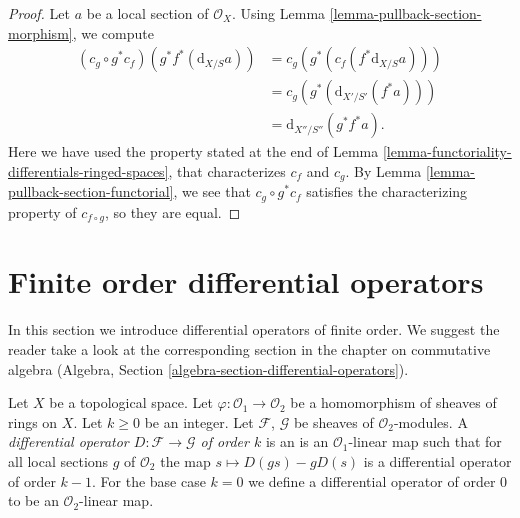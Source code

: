 \begin{proof}
Let $a$ be a local section of $\mathcal{O}_X$.
Using Lemma \ref{lemma-pullback-section-morphism}, we compute
\begin{align*}
(c_g\circ g^*c_f)(g^*f^*(\text{d}_{X/S}a))
&=c_g(g^*(c_f(f^*\text{d}_{X/S}a)))\\
&=c_g(g^*(\text{d}_{X'/S'}(f^*a)))\\
&=\text{d}_{X''/S''}(g^*f^*a).
\end{align*}
Here we have used the property stated at the end of
Lemma \ref{lemma-functoriality-differentials-ringed-spaces},
that characterizes $c_f$ and $c_g$.
By Lemma \ref{lemma-pullback-section-functorial},
we see that $c_g\circ g^*c_f$ satisfies the characterizing
property of $c_{f\circ g}$, so they are equal.
\end{proof}
















\section{Finite order differential operators}
\label{section-differential-operators}

\noindent
In this section we introduce differential operators of finite order.
We suggest the reader take a look at the corresponding section
in the chapter on commutative algebra
(Algebra, Section \ref{algebra-section-differential-operators}).

\begin{definition}
\label{definition-differential-operators}
Let $X$ be a topological space. Let $\varphi : \mathcal{O}_1 \to \mathcal{O}_2$
be a homomorphism of sheaves of rings on $X$. Let $k \geq 0$ be an integer.
Let $\mathcal{F}$, $\mathcal{G}$ be sheaves of $\mathcal{O}_2$-modules.
A {\it differential operator $D : \mathcal{F} \to \mathcal{G}$ of order $k$}
is an is an $\mathcal{O}_1$-linear map such that for all local sections
$g$ of $\mathcal{O}_2$ the map $s \mapsto D(gs) - gD(s)$ is a
differential operator of order $k - 1$. For the base case $k = 0$
we define a differential operator of order $0$ to be an
$\mathcal{O}_2$-linear map.
\end{definition}


